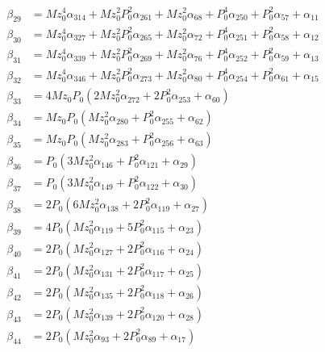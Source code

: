\documentclass{article}
\begin{document}
\begin{align*}
\beta_{29} &= Mz_{0}^{4} \alpha_{314} + Mz_{0}^{2} P_{0}^{2} \alpha_{261} + Mz_{0}^{2} \alpha_{68} + P_{0}^{4} \alpha_{250} + P_{0}^{2} \alpha_{57} + \alpha_{11} \\
\beta_{30} &= Mz_{0}^{4} \alpha_{327} + Mz_{0}^{2} P_{0}^{2} \alpha_{265} + Mz_{0}^{2} \alpha_{72} + P_{0}^{4} \alpha_{251} + P_{0}^{2} \alpha_{58} + \alpha_{12} \\
\beta_{31} &= Mz_{0}^{4} \alpha_{339} + Mz_{0}^{2} P_{0}^{2} \alpha_{269} + Mz_{0}^{2} \alpha_{76} + P_{0}^{4} \alpha_{252} + P_{0}^{2} \alpha_{59} + \alpha_{13} \\
\beta_{32} &= Mz_{0}^{4} \alpha_{346} + Mz_{0}^{2} P_{0}^{2} \alpha_{273} + Mz_{0}^{2} \alpha_{80} + P_{0}^{4} \alpha_{254} + P_{0}^{2} \alpha_{61} + \alpha_{15} \\
\beta_{33} &= 4 Mz_{0} P_{0} \left(2 Mz_{0}^{2} \alpha_{272} + 2 P_{0}^{2} \alpha_{253} + \alpha_{60}\right) \\
\beta_{34} &= Mz_{0} P_{0} \left(Mz_{0}^{2} \alpha_{280} + P_{0}^{2} \alpha_{255} + \alpha_{62}\right) \\
\beta_{35} &= Mz_{0} P_{0} \left(Mz_{0}^{2} \alpha_{283} + P_{0}^{2} \alpha_{256} + \alpha_{63}\right) \\
\beta_{36} &= P_{0} \left(3 Mz_{0}^{2} \alpha_{146} + P_{0}^{2} \alpha_{121} + \alpha_{29}\right) \\
\beta_{37} &= P_{0} \left(3 Mz_{0}^{2} \alpha_{149} + P_{0}^{2} \alpha_{122} + \alpha_{30}\right) \\
\beta_{38} &= 2 P_{0} \left(6 Mz_{0}^{2} \alpha_{138} + 2 P_{0}^{2} \alpha_{119} + \alpha_{27}\right) \\
\beta_{39} &= 4 P_{0} \left(Mz_{0}^{2} \alpha_{119} + 5 P_{0}^{2} \alpha_{115} + \alpha_{23}\right) \\
\beta_{40} &= 2 P_{0} \left(Mz_{0}^{2} \alpha_{127} + 2 P_{0}^{2} \alpha_{116} + \alpha_{24}\right) \\
\beta_{41} &= 2 P_{0} \left(Mz_{0}^{2} \alpha_{131} + 2 P_{0}^{2} \alpha_{117} + \alpha_{25}\right) \\
\beta_{42} &= 2 P_{0} \left(Mz_{0}^{2} \alpha_{135} + 2 P_{0}^{2} \alpha_{118} + \alpha_{26}\right) \\
\beta_{43} &= 2 P_{0} \left(Mz_{0}^{2} \alpha_{139} + 2 P_{0}^{2} \alpha_{120} + \alpha_{28}\right) \\
\beta_{44} &= 2 P_{0} \left(Mz_{0}^{2} \alpha_{93} + 2 P_{0}^{2} \alpha_{89} + \alpha_{17}\right) \\
\end{align*}
\end{document}
